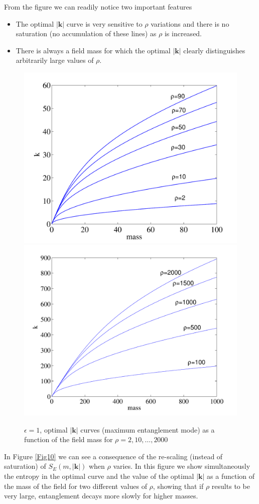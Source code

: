 From the figure we can readily notice two important features
\begin{itemize}
\item The optimal $|\bm k|$ curve is very sensitive to $\rho$ variations and  there is no saturation (no accumulation of these lines) as $\rho$ is increased.
\item There is always a field mass for which the optimal $|\bm k|$ clearly distinguishes arbitrarily large values of $\rho$.
\end{itemize}
\begin{figure}[h]
\begin{center}
\includegraphics[width=.51\textwidth]{maxmmaxk}\!\!\!\!\!\!\!
\includegraphics[width=.51\textwidth]{maxmmaxk2000}
\end{center}
\caption{$\epsilon=1$, optimal $|\bm k|$ curves (maximum entanglement mode) as a function of the field mass for $\rho=2,10,\dots,2000$}
\label{Fig8}
\end{figure}

In Figure \ref{Fig10} we can see a consequence of the re-scaling (instead of saturation) of $S_E(m,|\bm k|)$ when $\rho$ varies. In this figure we show simultaneously the entropy in the optimal curve and the value of the optimal $|\bm k|$ as a function of the mass of the field for two different values of $\rho$, showing that if $\rho$ results to be very large,   entanglement decays more slowly for higher masses. 



